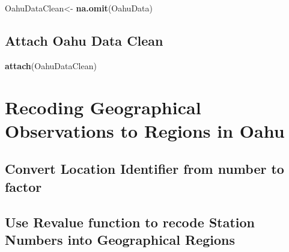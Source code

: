 \documentclass[12pt,]{article}
\newenvironment{Shaded}{\begin{snugshade}}{\end{snugshade}}
\newcommand{\KeywordTok}[1]{\textcolor[rgb]{0.13,0.29,0.53}{\textbf{#1}}}
\newcommand{\StringTok}[1]{\textcolor[rgb]{0.31,0.60,0.02}{#1}}
\newcommand{\OperatorTok}[1]{\textcolor[rgb]{0.81,0.36,0.00}{\textbf{#1}}}
\newcommand{\NormalTok}[1]{#1}
\begin{document}
\begin{Shaded}
\begin{Highlighting}[]
\NormalTok{OahuDataClean<-}\StringTok{ }\KeywordTok{na.omit}\NormalTok{(OahuData) }
\end{Highlighting}
\end{Shaded}

\subsection{Attach Oahu Data Clean}\label{attach-oahu-data-clean}

\begin{Shaded}
\begin{Highlighting}[]
\KeywordTok{attach}\NormalTok{(OahuDataClean)}
\end{Highlighting}
\end{Shaded}

\section{Recoding Geographical Observations to Regions in
Oahu}\label{recoding-geographical-observations-to-regions-in-oahu}

\subsection{Convert Location Identifier from number to
factor}\label{convert-location-identifier-from-number-to-factor}

\begin{Shaded}
\end{Shaded}

\subsection{Use Revalue function to recode Station Numbers into
Geographical
Regions}\label{use-revalue-function-to-recode-station-numbers-into-geographical-regions}
\end{document}
